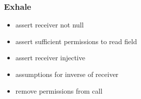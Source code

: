 \documentclass[12pt]{article}
\begin{document}
\subsubsection{Exhale}
\begin{itemize}
\item assert receiver not null 
\item assert sufficient permissions to read field
\item assert receiver injective
\item assumptions for inverse of receiver
\item remove permissions from call
\end{itemize}
\end{document}
